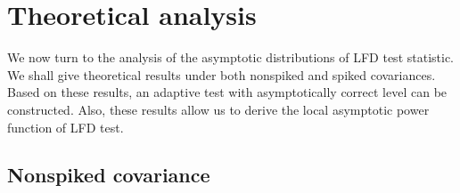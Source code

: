 \documentclass[12pt]{article} %
\theoremstyle{definition}
\begin{document}
\section{Theoretical analysis}\label{THEO}
We now turn to the analysis of the asymptotic distributions of LFD test statistic.
We shall give theoretical results under both nonspiked and spiked covariances.
Based on these results, an adaptive test with asymptotically correct level can be constructed.
Also, these results allow us to derive the local asymptotic power function of LFD test.









\subsection{Nonspiked covariance}
\end{document}
